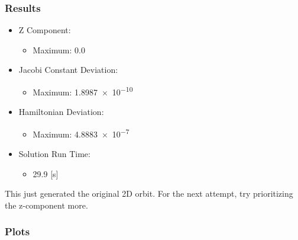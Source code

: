 \documentclass{article}
\begin{document}
\subsubsection{Results}

\begin{itemize}
    \item Z Component:
    \begin{itemize}
        \item Maximum: 0.0
    \end{itemize}
    \item Jacobi Constant Deviation:
    \begin{itemize}
        \item Maximum: \num{1.8987e-10}
    \end{itemize}
    \item Hamiltonian Deviation:
    \begin{itemize}
        \item Maximum: \num{4.8883e-7}
    \end{itemize}
    \item Solution Run Time:
    \begin{itemize}
        \item 29.9 [s]
    \end{itemize}  
\end{itemize}

This just generated the original 2D orbit. For the next attempt, try prioritizing the z-component more.

\newpage

\subsubsection{Plots}
\end{document}
